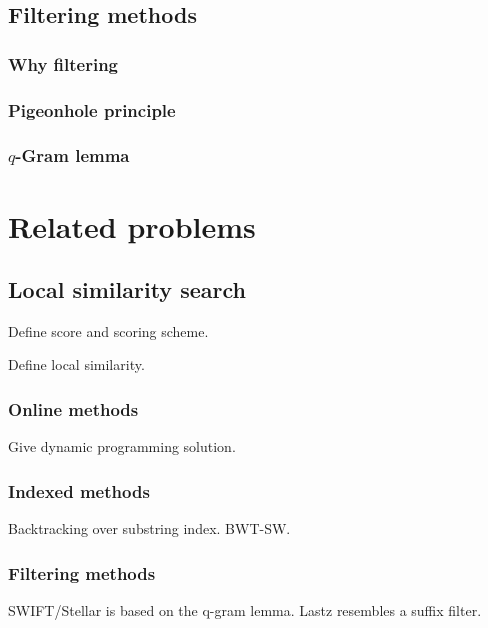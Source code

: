 
\subsection{Filtering methods}

\subsubsection{Why filtering}

\subsubsection{Pigeonhole principle}

\subsubsection{$q$-Gram lemma}


\section{Related problems}


\subsection{Local similarity search}

Define score and scoring scheme.

Define local similarity.

\subsubsection{Online methods}
Give dynamic programming solution.

\subsubsection{Indexed methods}
Backtracking over substring index. BWT-SW.

\subsubsection{Filtering methods}
SWIFT/Stellar is based on the q-gram lemma.
Lastz resembles a suffix filter.


